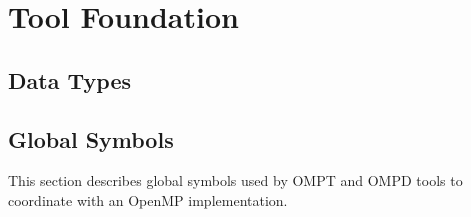 \section{Tool Foundation}
\subsection{Data Types}



\subsection{Global Symbols}
This section describes
global symbols used by OMPT and OMPD tools to coordinate with an OpenMP implementation.


